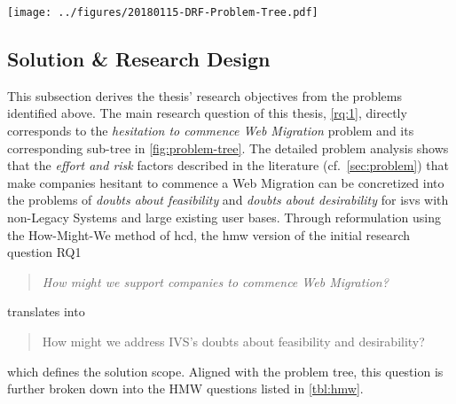 \begin{sidewaysfigure}
\hypertarget{fig:problem-tree}{%
\centering
\texttt{[image: ../figures/20180115-DRF-Problem-Tree.pdf]}
\caption{Hierarchical Representation of Problem Domain as LFA Problem Tree}\label{fig:problem-tree}
}
\end{sidewaysfigure}

\hypertarget{solution-research-design}{%
\subsection{Solution \& Research Design}\label{solution-research-design}}

This subsection derives the thesis' research objectives from the problems identified above.
The main research question of this thesis, \cref{rq:1}, directly corresponds to the \emph{hesitation to commence \gls{Web Migration}} problem and its corresponding sub-tree in \cref{fig:problem-tree}.
The detailed problem analysis shows that the \emph{effort and risk} factors described in the literature (cf.~\cref{sec:problem}) that make companies hesitant to commence a \gls{Web Migration} can be concretized into the problems of \emph{doubts about feasibility} and \emph{doubts about desirability} for \glspl{isv} with non-\glspl{Legacy System} and large existing user bases.
Through reformulation using the How-Might-We method of \gls{hcd}, the \gls{hmw} version of the initial research question RQ1

\begin{quote}
\emph{How might we support companies to commence \gls{Web Migration}?}
\end{quote}

translates into

\begin{quote}
How might we address IVS's doubts about feasibility and desirability?
\end{quote}

which defines the solution scope.
Aligned with the problem tree, this question is further broken down into the HMW questions listed in \cref{tbl:hmw}. 

